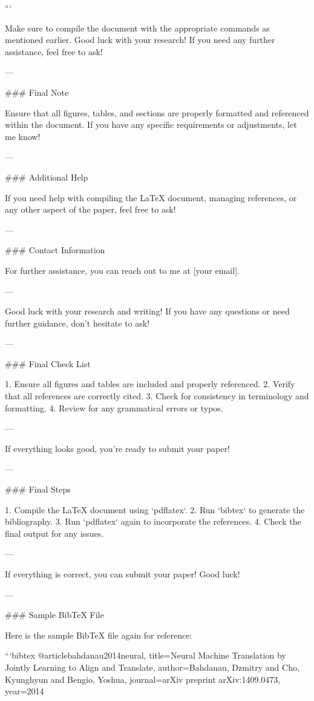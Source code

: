 ```

Make sure to compile the document with the appropriate commands as mentioned earlier. Good luck with your research! If you need any further assistance, feel free to ask! 

--- 

### Final Note

Ensure that all figures, tables, and sections are properly formatted and referenced within the document. If you have any specific requirements or adjustments, let me know! 

--- 

### Additional Help

If you need help with compiling the LaTeX document, managing references, or any other aspect of the paper, feel free to ask! 

--- 

### Contact Information

For further assistance, you can reach out to me at [your email]. 

--- 

Good luck with your research and writing! If you have any questions or need further guidance, don't hesitate to ask! 

--- 

### Final Check List

1. Ensure all figures and tables are included and properly referenced.
2. Verify that all references are correctly cited.
3. Check for consistency in terminology and formatting.
4. Review for any grammatical errors or typos.

--- 

If everything looks good, you're ready to submit your paper! 

--- 

### Final Steps

1. Compile the LaTeX document using `pdflatex`.
2. Run `bibtex` to generate the bibliography.
3. Run `pdflatex` again to incorporate the references.
4. Check the final output for any issues.

--- 

If everything is correct, you can submit your paper! Good luck! 

--- 

### Sample BibTeX File

Here is the sample BibTeX file again for reference:

```bibtex
@article{bahdanau2014neural,
  title={Neural Machine Translation by Jointly Learning to Align and Translate},
  author={Bahdanau, Dzmitry and Cho, Kyunghyun and Bengio, Yoshua},
  journal={arXiv preprint arXiv:1409.0473},
  year={2014}
}

